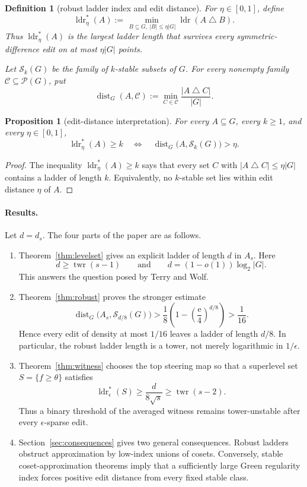 \documentclass[10pt,a4paper]{amsart}
\newtheorem{proposition}[theorem]{Proposition}
\newtheorem{definition}[theorem]{Definition}
\numberwithin{theorem}{section}
\newcommand{\abs}[1]{\lvert #1\rvert}
\newcommand{\twr}{\operatorname{twr}}
\newcommand{\ldr}{\operatorname{ldr}}
\newcommand{\ldrs}{\operatorname{ldr}^{*}}
\newcommand{\Stable}{\mathcal{S}}
\newcommand{\econst}{\mathrm e}
\begin{document}
\begin{definition}[robust ladder index and edit distance]\label{def:robust-index}
For $\eta\in[0,1]$, define
\[
  \ldrs_\eta(A):=
  \min_{\,B\subseteq G,\ \abs B\le\eta\abs G}
  \ldr(A\mathbin\triangle B).
\]
Thus $\ldrs_\eta(A)$ is the largest ladder length that survives every
symmetric-difference edit on at most $\eta\abs G$ points.

Let $\Stable_k(G)$ be the family of $k$-stable subsets of $G$.  For every
nonempty family $\mathcal C\subseteq\mathcal P(G)$, put
\[
  \operatorname{dist}_G(A,\mathcal C)
  :=\min_{C\in\mathcal C}\frac{\abs{A\mathbin\triangle C}}{\abs G}.
\]
\end{definition}

\begin{proposition}[edit-distance interpretation]\label{prop:distance}
For every $A\subseteq G$, every $k\ge1$, and every $\eta\in[0,1]$,
\[
  \ldrs_\eta(A)\ge k
  \quad\Longleftrightarrow\quad
  \operatorname{dist}_G\bigl(A,\Stable_k(G)\bigr)>\eta.
\]
\end{proposition}

\begin{proof}
The inequality $\ldrs_\eta(A)\ge k$ says that every set $C$ with
$\abs{A\mathbin\triangle C}\le\eta\abs G$ contains a ladder of length
$k$.  Equivalently, no $k$-stable set lies within edit distance $\eta$ of
$A$.
\end{proof}

\paragraph{Results.}
Let $d=d_s$.  The four parts of the paper are as follows.
\begin{enumerate}
\item Theorem~\ref{thm:levelset} gives an explicit ladder of length $d$ in
  $A_s$.  Here
  \[
    d\ge\twr(s-1)
    \qquad\text{and}\qquad
    d=(1-o(1))\log_2\abs G.
  \]
  This answers the question posed by Terry and Wolf.
\item Theorem~\ref{thm:robust} proves the stronger estimate
  \[
    \operatorname{dist}_G\bigl(A_s,\Stable_{d/8}(G)\bigr)
    >\frac18\left(1-\left(\frac{\econst}{4}\right)^{d/8}\right)
    >\frac1{16}.
  \]
  Hence every edit of density at most $1/16$ leaves a ladder of length
  $d/8$.  In particular, the robust ladder length is a tower, not merely
  logarithmic in $1/\epsilon$.
\item Theorem~\ref{thm:witness} chooses the top steering map so that a
  superlevel set $S=\{f\ge\theta\}$ satisfies
  \[
    \ldrs_\epsilon(S)\ge\frac{d}{8\sqrt{s}}\ge\twr(s-2).
  \]
  Thus a binary threshold of the averaged witness remains tower-unstable
  after every $\epsilon$-sparse edit.
\item Section~\ref{sec:consequences} gives two general consequences.
  Robust ladders obstruct approximation by low-index unions of cosets.
  Conversely, stable coset-approximation theorems imply that a sufficiently
  large Green regularity index forces positive edit distance from every
  fixed stable class.
\end{enumerate}
\end{document}
